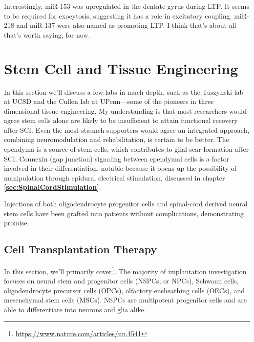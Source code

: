 \documentclass[12pt]{report}
\begin{document}
Interestingly, miR-153 was upregulated in the dentate gyrus during LTP. It seems to be required for exocytosis, suggesting it has a role in excitatory coupling. miR-218 and miR-137 were also named as promoting LTP. I think that's about all that's worth saying, for now. 









\chapter{Stem Cell and Tissue Engineering}

\label{sec:Stem-Cells}

In this section we'll discuss a few labs in much depth, such as the Tuszynski lab at UCSD and the Cullen lab at UPenn---some of the pioneers in three dimensional tissue engineering. My understanding is that most researchers would agree stem cells alone are likely to be insufficient to attain functional recovery after SCI. Even the most staunch supporters would agree an integrated approach, combining neuromodulation and rehabilitation, is certain to be better. The ependyma is a source of stem cells, which contributes to glial scar formation after SCI. Connexin (gap junction) signaling between ependymal cells is a factor involved in their differentiation, notable because it opens up the possibility of manipulation through epidural electrical stimulation, discussed in chapter \textbf{\ref{sec:SpinalCordStimulation}}.\newline

Injections of both oligodendrocyte progenitor cells and spinal-cord derived neural stem cells have been grafted into patients without complications, demonstrating promise.\newline

\section{Cell Transplantation Therapy}

In this section, we'll primarily cover\footnote{\url{https://www.nature.com/articles/nn.4541}}. The majority of implantation investigation focuses on neural stem and progenitor cells (NSPCs, or NPCs), Schwann cells, oligodendrocyte precursor cells (OPCs), olfactory ensheathing cells (OECs), and mesenchymal stem cells (MSCs). NSPCs are multipotent progenitor cells and are able to differentiate into neurons and glia alike.\newline
\end{document}
